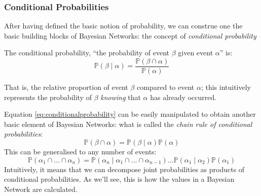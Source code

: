 \subsubsection{Conditional Probabilities}
After having defined the basic notion of probability, we can construe one the basic building blocks of Bayesian Networks: the concept of \textit{conditional probability} 
\begin{definition}
	The conditional probability, ``the probability of event $\beta$ given event $\alpha$'' is:
\begin{equation} \label{eq:conditionalprobability}
\mathbb{P}(\beta \mid \alpha) = \frac{\mathbb{P}(\beta \cap \alpha)}{\mathbb{P}(\alpha)}
\end{equation}
\end{definition}
That is, the relative proportion of event $\beta$ compared to event $\alpha$; this intuitively represents the probability of $\beta$ \textit{knowing} that $\alpha$ has already occurred.

Equation \ref{eq:conditionalprobability} can be easily manipulated to obtain another basic element of Bayesian Networks: what is called the \textit{chain rule of conditional probabilities}:
\begin{equation} \label{eq:chainrule}
	\mathbb{P}(\beta \cap \alpha) = \mathbb{P}(\beta \mid \alpha) \mathbb{P}(\alpha)
\end{equation}
This can be generalised to any number of events:
\begin{equation} \label{eq:chainrule}
	\mathbb{P}(\alpha_1 \cap \ldots \cap \alpha_n) = \mathbb{P}(\alpha_n \mid \alpha_1 \cap \ldots \cap \alpha_{n-1}) \ldots \mathbb{P}(\alpha_1 \mid \alpha_2 ) \mathbb{P}(\alpha_1) 
\end{equation}
Intuitively, it means that we can decompose joint probabilities as products of conditional probabilities.  
As we'll see, this is how the values in a Bayesian Network are calculated.

